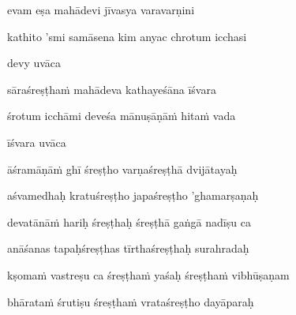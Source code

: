 evam eṣa mahādevi jīvasya varavarṇini\thinspace{\dandab} \dontdisplaylinenum

kathito 'smi samāsena kim anyac chrotum icchasi \veg\dontdisplaylinenum


devy uvāca~{\dandab}\dontdisplaylinenum 

sāraśreṣṭha\.m mahādeva kathayeśāna īśvara\thinspace{\danda} \dontdisplaylinenum

śrotum icchāmi deveśa mānuṣāṇā\.m hita\.m vada \veg\dontdisplaylinenum

īśvara uvāca~{\dandab}\dontdisplaylinenum 

āśramāṇā\.m ghī śreṣṭho varṇaśreṣṭhā dvijātayaḥ\thinspace{\danda} \dontdisplaylinenum

aśvamedhaḥ kratuśreṣṭho japaśreṣṭho 'ghamarṣaṇaḥ \veg\dontdisplaylinenum

devatānā\.m hariḥ śreṣṭhaḥ śreṣṭhā gaṅgā nadīṣu ca\thinspace{\dandab} \dontdisplaylinenum

anāśanas tapaḥśreṣṭhas tīrthaśreṣṭhaḥ surahradaḥ \veg\dontdisplaylinenum

kṣoma\.m vastreṣu ca śreṣṭha\.m yaśaḥ śreṣṭha\.m vibhūṣaṇam\thinspace{\dandab} \dontdisplaylinenum

bhārata\.m śrutiṣu śreṣṭha\.m vrataśreṣṭho dayāparaḥ \veg\dontdisplaylinenum

